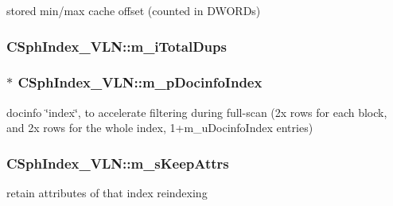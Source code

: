 stored min/max cache offset (counted in D\-W\-O\-R\-Ds) 

\hypertarget{classCSphIndex__VLN_ad1a73d5715b4677c8b1aa90864511d57}{
\subsubsection[{m\-\_\-i\-Total\-Dups}]{ C\-Sph\-Index\-\_\-\-V\-L\-N\-::m\-\_\-i\-Total\-Dups\hspace{0.3cm}{\ttfamily [private]}}}\label{classCSphIndex__VLN_ad1a73d5715b4677c8b1aa90864511d57}
\hypertarget{classCSphIndex__VLN_adb6dfe7998b4af88348e89493be91761}{
\subsubsection[{m\-\_\-p\-Docinfo\-Index}]{$\ast$ C\-Sph\-Index\-\_\-\-V\-L\-N\-::m\-\_\-p\-Docinfo\-Index\hspace{0.3cm}{\ttfamily [private]}}}\label{classCSphIndex__VLN_adb6dfe7998b4af88348e89493be91761}


docinfo \char`\"{}index\char`\"{}, to accelerate filtering during full-\/scan (2x rows for each block, and 2x rows for the whole index, 1+m\-\_\-u\-Docinfo\-Index entries) 

\hypertarget{classCSphIndex__VLN_aeb67c1c2b19b152ad3d5f965b49dd919}{
\subsubsection[{m\-\_\-s\-Keep\-Attrs}]{ C\-Sph\-Index\-\_\-\-V\-L\-N\-::m\-\_\-s\-Keep\-Attrs\hspace{0.3cm}{\ttfamily [private]}}}\label{classCSphIndex__VLN_aeb67c1c2b19b152ad3d5f965b49dd919}


retain attributes of that index reindexing 

